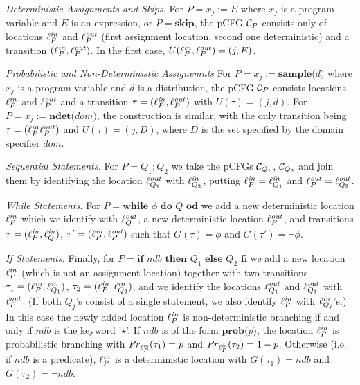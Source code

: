 \begin{compactenum}
\item {\em Deterministic Assignments and Skips.}
For $P= {x_j}{:=}{E}$ where $x_j$ is a program variable and $E$ is an 
expression, or $P = \textbf{skip}$, the pCFG $\mathcal{C}_P$ consists only of
locations $\ell^{\mathit{in}}_P$ and $\ell^{\mathit{out}}_P$ (first assignment location, 
second one deterministic) and a
transition $(\ell^{\mathit{in}}_{P},\ell^{\mathit{out}}_P)$. In the first case, 
$U(\ell^{\mathit{in}}_{P},\ell^{\mathit{out}}_P)=(j,E)$.
\item {\em Probabilistic and Non-Deterministic Assignemnts}
For $P= {x_j}{:=}{\textbf{sample($d$)}}$ where $x_j$ is a program variable and 
$d$ is a distribution, the pCFG $\mathcal{C}_P$ consists locations $\ell^{\mathit{in}}_P$ 
and $\ell^{\mathit{out}}_P$ and a
transition $\tau=(\ell^{\mathit{in}}_{P},\ell^{\mathit{out}}_P)$ with $U(\tau)=(j,d)$. For 
$P= 
{x_j}{:=}{\textbf{ndet($\mathit{dom}$)}}$, the construction is similar, with 
the only transition being $\tau=(\ell^{\mathit{in}}_{P}\ell^{\mathit{out}}_P)$ and 
$U(\tau)=(j,D)$, where 
$D$ is 
the set specified by the domain specifier $\mathit{dom}$.

\item {\em Sequential Statements.}
For $P = Q_1;Q_2$ we take the pCFGs $\mathcal{C}_{Q_1}$, $\mathcal{C}_{Q_2}$ and
join them by identifying the location $\ell^{\mathit{out}}_{Q_1}$ with
$\ell^{\mathit{in}}_{Q_2}$, putting $\ell^{\mathit{in}}_{P}=\ell^{\mathit{in}}_{Q_1}$ and
$\ell^{\mathit{out}}_{P}=\ell^{\mathit{out}}_{Q_2}$.

\item {\em While Statements.}
For $P = \textbf{while $\phi$ do }Q \textbf{ od}$ we add a new deterministic
location $\ell^{\mathit{in}}_{P}$ which we identify with $\ell^{\mathit{out}}_{Q}$, a new
deterministic location $\ell^{\mathit{out}}_{P}$, and transitions
$\tau=(\ell^{\mathit{in}}_{P},\ell^{\mathit{in}}_{Q})$,
$\tau'=(\ell^{\mathit{in}}_{P},\ell^{\mathit{out}}_{P})$ such that $G(\tau)=\phi$ and
$G(\tau')=\neg\phi$.

\item {\em If Statements.}
Finally, for $P = \textbf{if $\mathit{ndb}$ then }Q_1 \textbf{ else } Q_2
\textbf{ fi}$ we add a new location $\ell^{\mathit{in}}_{P}$ (which is not an 
assignment location) together with two
transitions $\tau_1 = (\ell^{\mathit{in}}_{P},\ell^{\mathit{in}}_{Q_1})$, $\tau_2 =
(\ell^{\mathit{in}}_{P},\ell^{\mathit{in}}_{Q_2})$, and we identify the locations 
$\ell^{\mathit{out}}_{Q_1}$ and $\ell^{\mathit{out}}_{Q_1}$ with $\ell^{\mathit{out}}_{P}$. (If both
$Q_j$'s consist of a single statement, we also identify $\ell^{\mathit{in}}_{P}$ with 
$\ell^{\mathit{in}}_{Q_j}$'s.) In this
case the newly added location $\ell^{\mathit{in}}_{P}$ is non-deterministic branching if 
and only 
if
$ndb$ is the keyword '$\star$'. If
$\mathit{ndb}$ is of the form $\textbf{prob($p$)}$, the location $\ell^{\mathit{in}}_{P}$
is probabilistic branching with $\mathit{Pr}_{\ell^{\mathit{in}}_{P}}(\tau_1)=p$ and
$\mathit{Pr}_{\ell^{\mathit{in}}_{P}}(\tau_2)=1-p$. Otherwise (i.e. if $\mathit{ndb}$ is a
predicate), $\ell^{\mathit{in}}_{P}$ is a deterministic location
with $G(\tau_1)=\mathit{ndb}$ and $G(\tau_2)=\neg \mathit{ndb}$.
\end{compactenum}
